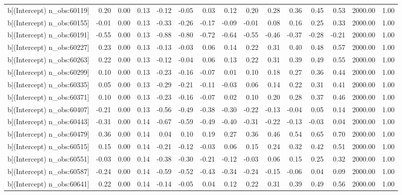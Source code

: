 \begin{table}[ht]
\begin{tabular}{rrrrrrrrrrrrrrr}
  b[(Intercept) n\_obs:60119] & 0.20 & 0.00 & 0.13 & -0.12 & -0.05 & 0.03 & 0.12 & 0.20 & 0.28 & 0.36 & 0.45 & 0.53 & 2000.00 & 1.00 \\ 
  b[(Intercept) n\_obs:60155] & -0.01 & 0.00 & 0.13 & -0.33 & -0.26 & -0.17 & -0.09 & -0.01 & 0.08 & 0.16 & 0.25 & 0.33 & 2000.00 & 1.00 \\ 
  b[(Intercept) n\_obs:60191] & -0.55 & 0.00 & 0.13 & -0.88 & -0.80 & -0.72 & -0.64 & -0.55 & -0.46 & -0.37 & -0.28 & -0.21 & 2000.00 & 1.00 \\ 
  b[(Intercept) n\_obs:60227] & 0.23 & 0.00 & 0.13 & -0.13 & -0.03 & 0.06 & 0.14 & 0.22 & 0.31 & 0.40 & 0.48 & 0.57 & 2000.00 & 1.00 \\ 
  b[(Intercept) n\_obs:60263] & 0.22 & 0.00 & 0.13 & -0.12 & -0.04 & 0.06 & 0.13 & 0.22 & 0.31 & 0.39 & 0.49 & 0.55 & 2000.00 & 1.00 \\ 
  b[(Intercept) n\_obs:60299] & 0.10 & 0.00 & 0.13 & -0.23 & -0.16 & -0.07 & 0.01 & 0.10 & 0.18 & 0.27 & 0.36 & 0.44 & 2000.00 & 1.00 \\ 
  b[(Intercept) n\_obs:60335] & 0.05 & 0.00 & 0.13 & -0.29 & -0.21 & -0.11 & -0.03 & 0.06 & 0.14 & 0.22 & 0.31 & 0.41 & 2000.00 & 1.00 \\ 
  b[(Intercept) n\_obs:60371] & 0.10 & 0.00 & 0.13 & -0.23 & -0.16 & -0.07 & 0.02 & 0.10 & 0.20 & 0.28 & 0.37 & 0.46 & 2000.00 & 1.00 \\ 
  b[(Intercept) n\_obs:60407] & -0.21 & 0.00 & 0.13 & -0.56 & -0.49 & -0.38 & -0.30 & -0.22 & -0.13 & -0.04 & 0.05 & 0.14 & 2000.00 & 1.00 \\ 
  b[(Intercept) n\_obs:60443] & -0.31 & 0.00 & 0.14 & -0.67 & -0.59 & -0.49 & -0.40 & -0.31 & -0.22 & -0.13 & -0.03 & 0.04 & 2000.00 & 1.00 \\ 
  b[(Intercept) n\_obs:60479] & 0.36 & 0.00 & 0.14 & 0.04 & 0.10 & 0.19 & 0.27 & 0.36 & 0.46 & 0.54 & 0.65 & 0.70 & 2000.00 & 1.00 \\ 
  b[(Intercept) n\_obs:60515] & 0.15 & 0.00 & 0.14 & -0.21 & -0.12 & -0.03 & 0.06 & 0.15 & 0.24 & 0.32 & 0.42 & 0.51 & 2000.00 & 1.00 \\ 
  b[(Intercept) n\_obs:60551] & -0.03 & 0.00 & 0.14 & -0.38 & -0.30 & -0.21 & -0.12 & -0.03 & 0.06 & 0.15 & 0.25 & 0.32 & 2000.00 & 1.00 \\ 
  b[(Intercept) n\_obs:60587] & -0.24 & 0.00 & 0.14 & -0.59 & -0.52 & -0.43 & -0.34 & -0.24 & -0.15 & -0.06 & 0.04 & 0.09 & 2000.00 & 1.00 \\ 
  b[(Intercept) n\_obs:60641] & 0.22 & 0.00 & 0.14 & -0.14 & -0.05 & 0.04 & 0.12 & 0.22 & 0.31 & 0.39 & 0.49 & 0.56 & 2000.00 & 1.00 \\ 

\end{tabular}
\end{table}
